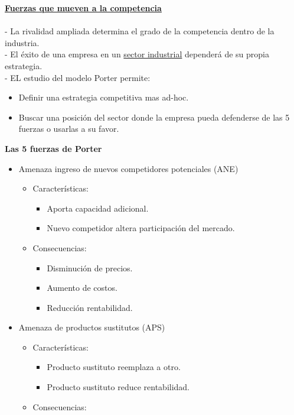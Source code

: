 \documentclass{templateNote}
\begin{document}
\noindent\underline{\textbf{Fuerzas que mueven a la competencia}}\\\\
- La rivalidad ampliada determina el grado de la competencia dentro de la industria.\\
- El éxito de una empresa en un \hyperlink{sec_ind}{sector industrial} dependerá de su propia estrategia. \\
- EL estudio del modelo Porter permite:
\begin{itemize}
    \item Definir una estrategia competitiva mas ad-hoc.
    \item Buscar una posición del sector donde la empresa pueda defenderse de las 5 fuerzas o usarlas a su favor.
\end{itemize} 
\textbf{Las 5 fuerzas de Porter}
    \begin{itemize}
        \item Amenaza ingreso de nuevos competidores potenciales (ANE)
        \begin{itemize}
            \item Características:
            \begin{itemize}
                \item Aporta capacidad adicional.
                \item Nuevo competidor altera participación del mercado.
            \end{itemize}
            \item Consecuencias:
            \begin{itemize}
                \item Disminución de precios.
                \item Aumento de costos.
                \item Reducción rentabilidad.
            \end{itemize}
        \end{itemize}
        \item Amenaza de productos sustitutos (APS)
        \begin{itemize}
            \item Características:
            \begin{itemize}
                \item Producto sustituto reemplaza a otro.
                \item Producto sustituto reduce rentabilidad.
            \end{itemize}
            \item Consecuencias:

\end{itemize}
\end{itemize}
\end{document}
